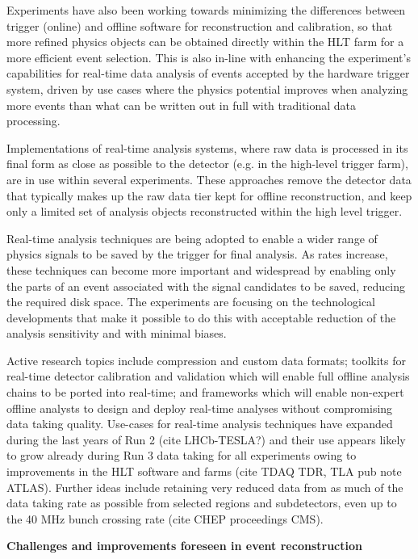 \documentclass[11pt,a4paper]{article}
\begin{document}
Experiments have also been working towards minimizing the differences
between trigger (online) and offline software for reconstruction and
calibration, so that more refined physics objects can be obtained
directly within the HLT farm for a more efficient event selection. This
is also in-line with enhancing the experiment's capabilities for
real-time data analysis of events accepted by the hardware trigger
system, driven by use cases where the physics potential improves when
analyzing more events than what can be written out in full with
traditional data processing.

Implementations of real-time analysis systems, where raw data is
processed in its final form as close as possible to the detector (e.g.
in the high-level trigger farm), are in use within several experiments.
These approaches remove the detector data that typically makes up the
raw data tier kept for offline reconstruction, and keep only a limited
set of analysis objects reconstructed within the high level trigger.

Real-time analysis techniques are being adopted to enable a wider range
of physics signals to be saved by the trigger for final analysis. As
rates increase, these techniques can become more important and
widespread by enabling only the parts of an event associated with the
signal candidates to be saved, reducing the required disk space. The
experiments are focusing on the technological developments that make it
possible to do this with acceptable reduction of the analysis
sensitivity and with minimal biases.

Active research topics include compression and custom data formats;
toolkits for real-time detector calibration and validation which will
enable full offline analysis chains to be ported into real-time; and
frameworks which will enable non-expert offline analysts to design and
deploy real-time analyses without compromising data taking quality.
Use-cases for real-time analysis techniques have expanded during the
last years of Run 2 (cite LHCb-TESLA?) and their use appears likely to
grow already during Run 3 data taking for all experiments owing to
improvements in the HLT software and farms (cite TDAQ TDR, TLA pub note
ATLAS). Further ideas include retaining very reduced data from as much
of the data taking rate as possible from selected regions and
subdetectors, even up to the 40 MHz bunch crossing rate (cite CHEP
proceedings CMS).

\textbf{Challenges and improvements foreseen in event reconstruction}
\end{document}

